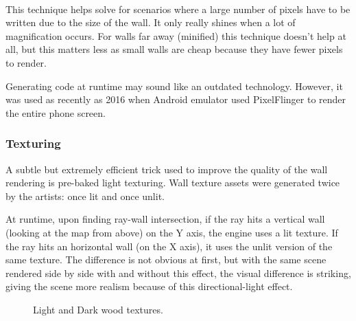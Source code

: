 \par

\begin{minipage}{\textwidth}
 \centering
 \vspace*{0.5cm}\\
\end{minipage}
This technique helps solve for scenarios where a large number of pixels have to be written due to the size of the wall. It only really shines when a lot of magnification occurs. For walls far away (minified) this technique doesn't help at all, but this matters less as small walls are cheap because they have fewer pixels
to render.\\
\par
{} Generating code at runtime may sound like an outdated technology. However, it was used as recently as 2016 when Android emulator used PixelFlinger to render the entire phone screen.





















\subsubsection{Texturing}
A subtle but extremely efficient trick used to improve the quality of the wall rendering is pre-baked light texturing. Wall texture assets were generated twice by the artists: once lit and once unlit.\\
\par
At runtime, upon finding ray-wall intersection, if the ray hits a vertical wall (looking at the map from above) on the Y axis, the engine uses a lit texture. If the ray hits an horizontal wall (on the X axis), it uses the unlit version of the same texture. The difference is not obvious at first, but with the same scene rendered side by side with and without this effect, the visual difference is striking, giving the scene more realism because of this directional-light effect.\\
\par
  \begin{figure}[H]
\centering
 \caption{Light and Dark wood textures.}
 \end{figure}
\par

